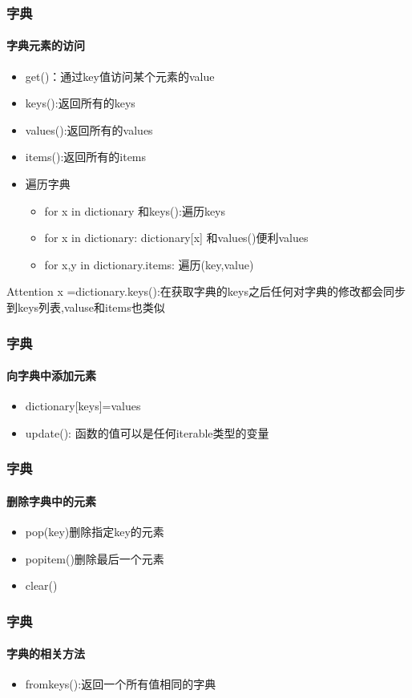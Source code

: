 \documentclass{beamer}
\begin{document}
\begin{frame}[t]
	\frametitle{字典}
	\framesubtitle{字典元素的访问}
	\begin{itemize}
		\item get()：通过key值访问某个元素的value
		\item keys():返回所有的keys
		\item values():返回所有的values
		\item items():返回所有的items
		\item 遍历字典
		      \begin{itemize}
			      \item for x in dictionary 和keys():遍历keys
			      \item for x in dictionary: dictionary[x] 和values()便利values
			      \item for x,y in dictionary.items: 遍历(key,value)
		      \end{itemize}

	\end{itemize}
	\begin{alertblock}{Attention}
		x =dictionary.keys():在获取字典的keys之后任何对字典的修改都会同步到keys列表,valuse和items也类似
	\end{alertblock}

\end{frame}
\begin{frame}[t]
	\frametitle{字典}
	\framesubtitle{向字典中添加元素}
	\begin{itemize}
		\item dictionary[keys]=values
		\item update(): 函数的值可以是任何iterable类型的变量
	\end{itemize}

\end{frame}
\begin{frame}[t]
	\frametitle{字典}
	\framesubtitle{删除字典中的元素}
	\begin{itemize}
		\item pop(key)删除指定key的元素
		\item popitem()删除最后一个元素
		\item clear()
	\end{itemize}
\end{frame}
\begin{frame}[t]
	\frametitle{字典}
	\framesubtitle{字典的相关方法}
	\begin{itemize}
		\item fromkeys():返回一个所有值相同的字典
	\end{itemize}

\end{frame}
\end{document}
